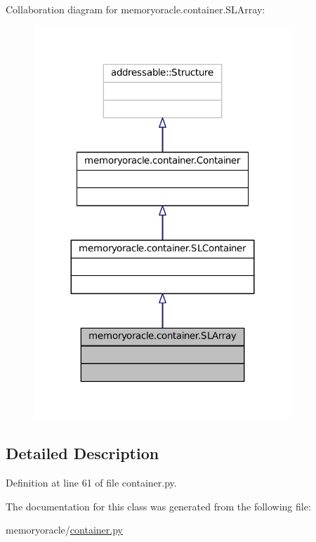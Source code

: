 Collaboration diagram for memoryoracle.\+container.\+S\+L\+Array\+:\nopagebreak
\begin{figure}[H]
\begin{center}
\leavevmode
\includegraphics[width=275pt]{classmemoryoracle_1_1container_1_1SLArray__coll__graph}
\end{center}
\end{figure}


\subsection{Detailed Description}


Definition at line 61 of file container.\+py.



The documentation for this class was generated from the following file\+:\begin{DoxyCompactItemize}
\item 
memoryoracle/\hyperlink{container_8py}{container.\+py}\end{DoxyCompactItemize}
